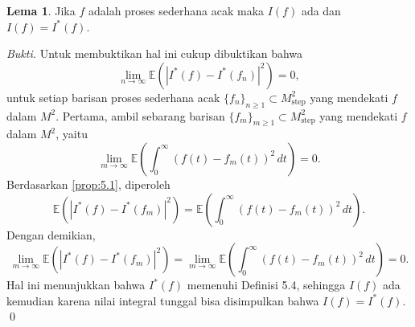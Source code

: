 \documentclass[aspectratio=169,11pt]{beamer}
\theoremstyle{definition}
\newtheorem{lema}{Lema}
\newcommand{\myref}[1]{\hyperref[#1]{\nameCref{#1} \ref*{#1}}}
\begin{document}
\begin{frame}[allowframebreaks]{\insertsection}{\insertsubsection}
  \begin{lema}
    Jika $f$ adalah proses sederhana acak maka $I(f)$ ada dan $I(f) = I^*(f)$.
  \end{lema}
  \textit{Bukti.} Untuk membuktikan hal ini cukup dibuktikan bahwa
  \begin{equation*}
    \lim_{n \to \infty} \mathbb{E}\left(|I^*(f) - I^*(f_n)|^2\right) = 0,
  \end{equation*}
  untuk setiap barisan proses sederhana acak $\{f_n\}_{n \geq 1} \subset M_{\text{step}}^2$ yang mendekati $f$ dalam $M^2$.
  Pertama, ambil sebarang barisan $\{f_m\}_{m \geq 1} \subset M_{\text{step}}^2$ yang mendekati $f$ dalam $M^2$, yaitu
  \begin{equation*}
    \lim_{m \to \infty} \mathbb{E}\left(\int_0^\infty (f(t) - f_m(t))^2 \, dt\right) = 0.
  \end{equation*}
  Berdasarkan \myref{prop:5.1}, diperoleh
  \begin{equation*}
    \mathbb{E}(|I^*(f) - I^*(f_m)|^2) = \mathbb{E}\left(\int_0^\infty (f(t) - f_m(t))^2 \, dt\right).
  \end{equation*}
  Dengan demikian,
  \begin{equation*}
    \lim_{m \to \infty} \mathbb{E}(|I^*(f) - I^*(f_m)|^2) = \lim_{m \to \infty} \mathbb{E}\left(\int_0^\infty (f(t) - f_m(t))^2 \, dt\right) = 0.
  \end{equation*}
  Hal ini menunjukkan bahwa $I^*(f)$ memenuhi Definisi 5.4, sehingga $I(f)$ ada kemudian karena nilai integral tunggal bisa disimpulkan bahwa $I(f) = I^*(f)$. \qed
\end{frame}
\end{document}
